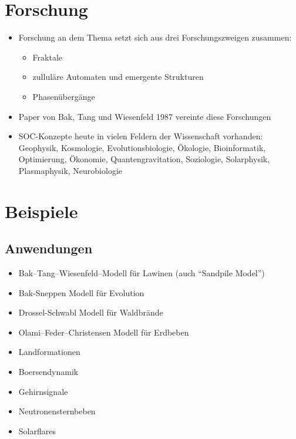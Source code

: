 \documentclass{beamer}
\begin{document}
\section{Forschung}
\begin{frame}{\insertsection}{\insertsubsection}
    \begin{itemize}
        \item Forschung an dem Thema setzt sich aus drei Forschungszweigen zusammen:
        \begin{itemize}
            \item Fraktale
            \item zulluläre Automaten und emergente Strukturen
            \item Phasenübergänge
        \end{itemize}
        \pause
        \item Paper von Bak, Tang und Wiesenfeld 1987 vereinte diese Forschungen
        \pause
        \item SOC-Konzepte heute in vielen Feldern der Wissenschaft vorhanden: Geophysik,
                Kosmologie, Evolutionsbiologie, Ökologie, Bioinformatik, Optimierung, Ökonomie,
                Quantengravitation, Soziologie, Solarphysik, Plasmaphysik, Neurobiologie
    \end{itemize}
\end{frame}

\section{Beispiele}
\subsection{Anwendungen}
\begin{frame}{\insertsection}{\insertsubsection}
	\begin{itemize}
        \item Bak–Tang–Wiesenfeld–Modell für Lawinen (auch ``Sandpile Model'')
        \item Bak-Sneppen Modell für Evolution
        \item Drossel-Schwabl Modell für Waldbrände
        \item Olami–Feder–Christensen Modell für Erdbeben
        \pause
        \item Landformationen
        \item Boersendynamik
        \item Gehirnsignale
        \item Neutronensternbeben
        \item Solarflares
	\end{itemize}
\end{frame}
\end{document}
